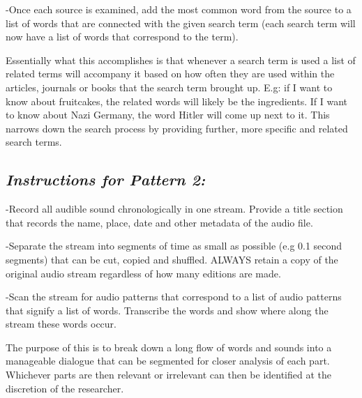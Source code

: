 \documentclass{article}
\begin{document}
-Once each source is examined, add the most common word from the source to a list of words that are connected with the given search term (each search term will now have a list of words that correspond to the term).

Essentially what this accomplishes is that whenever a search term is used a list of related terms will accompany it based on how often they are used within the articles, journals or books that the search term brought up. E.g: if I want to know about fruitcakes, the related words will likely be the ingredients. If I want to know about Nazi Germany, the word Hitler will come up next to it. This narrows down the search process by providing further, more specific and related search terms.
\subsection*{\textit{Instructions for Pattern 2:}}
-Record all audible sound chronologically in one stream. Provide a title section that records the name, place, date and other metadata of the audio file.

-Separate the stream into segments of time as small as possible (e.g 0.1 second segments) that can be cut, copied and shuffled. ALWAYS retain a copy of the original audio stream regardless of how many editions are made.

-Scan the stream for audio patterns that correspond to a list of audio patterns that signify a list of words. Transcribe the words and show where along the stream these words occur.

The purpose of this is to break down a long flow of words and sounds into a manageable dialogue that can be segmented for closer analysis of each part. Whichever parts are then relevant or irrelevant can then be identified at the discretion of the researcher.
\end{document}
